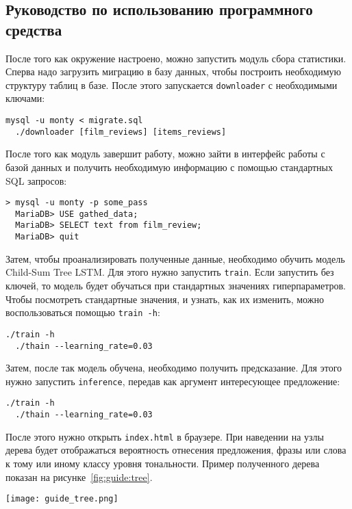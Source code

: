 \subsection{Руководство по использованию программного средства}
После того как окружение настроено, можно запустить модуль сбора статистики. Сперва надо загрузить миграцию в базу данных, чтобы построить необходимую структуру таблиц в базе. После этого запускается \texttt{downlo\-ader} с необходимыми ключами:
\medskip
\begin{lstlisting}[style=Python]
  mysql -u monty < migrate.sql
  ./downloader [film_reviews] [items_reviews]
\end{lstlisting}
\medskip

После того как модуль завершит работу, можно зайти в интерфейс работы с базой данных и получить необходимую информацию с помощью стандартных SQL запросов:
\medskip
\begin{lstlisting}[style=Python]
  > mysql -u monty -p some_pass
  MariaDB> USE gathed_data;
  MariaDB> SELECT text from film_review;
  MariaDB> quit
\end{lstlisting}
\medskip

Затем, чтобы проанализировать полученные данные, необходимо обучить модель Child-Sum Tree LSTM\@. Для этого нужно запустить \texttt{train}. Если запустить без ключей, то модель будет обучаться при стандартных значениях гиперпараметров. Чтобы посмотреть стандартные значения, и узнать, как их изменить, можно воспользоваться помощью \texttt{train -h}:
\medskip
\begin{lstlisting}[style=Python]
  ./train -h
  ./thain --learning_rate=0.03
\end{lstlisting}
\medskip

Затем, после так модель обучена, необходимо получить предсказание. Для этого нужно запустить \texttt{inference}, передав как аргумент интересующее предложение:
\medskip
\begin{lstlisting}[style=Python]
  ./train -h
  ./thain --learning_rate=0.03
\end{lstlisting}
\medskip

После этого нужно открыть \texttt{index.html} в браузере. При наведении на узлы дерева будет отображаться вероятность отнесения предложения, фразы или слова к тому или иному классу уровня тональности. Пример полученного дерева показан на рисунке~\ref{fig:guide:tree}.

\begin{center}
  \texttt{[image: guide\_tree.png]}
  \label{fig:guide:tree}
\end{center}

